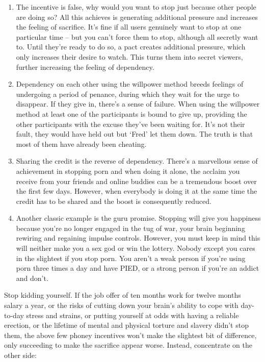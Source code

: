 \documentclass[
]{book}
\begin{document}
\begin{enumerate}
\def\labelenumi{\arabic{enumi}.}
\item
  The incentive is false, why would you want to stop just because other people are doing so? All this achieves is generating additional pressure and increases the feeling of sacrifice. It's fine if all users genuinely want to stop at one particular time -- but you can't force them to stop, although all secretly want to. Until they're ready to do so, a pact creates additional pressure, which only increases their desire to watch. This turns them into secret viewers, further increasing the feeling of dependency.
\item
  Dependency on each other using the willpower method breeds feelings of undergoing a period of penance, during which they wait for the urge to disappear. If they give in, there's a sense of failure. When using the willpower method at least one of the participants is bound to give up, providing the other participants with the excuse they've been waiting for. It's not their fault, they would have held out but `Fred' let them down. The truth is that most of them have already been cheating.
\item
  Sharing the credit is the reverse of dependency. There's a marvellous sense of achievement in stopping porn and when doing it alone, the acclaim you receive from your friends and online buddies can be a tremendous boost over the first few days. However, when everybody is doing it at the same time the credit has to be shared and the boost is consequently reduced.
\item
  Another classic example is the guru promise. Stopping will give you happiness because you're no longer engaged in the tug of war, your brain beginning rewiring and regaining impulse controls. However, you must keep in mind this will neither make you a sex god or win the lottery. Nobody except you cares in the slightest if you stop porn. You aren't a weak person if you're using porn three times a day and have PIED, or a strong person if you're an addict and don't.
\end{enumerate}

Stop kidding yourself. If the job offer of ten months work for twelve months salary a year, or the risks of cutting down your brain's ability to cope with day-to-day stress and strains, or putting yourself at odds with having a reliable erection, or the lifetime of mental and physical torture and slavery didn't stop them, the above few phoney incentives won't make the slightest bit of difference, only succeeding to make the sacrifice appear worse. Instead, concentrate on the other side:
\end{document}
